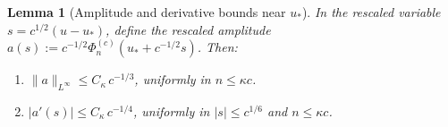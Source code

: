 \documentclass[12pt,a4paper]{amsart}
\newtheorem{lemma}[theorem]{Lemma}
\theoremstyle{definition}
\theoremstyle{remark}
\newcommand{\ustar}{u_*}
\begin{document}
\begin{lemma}[Amplitude and derivative bounds near $\ustar$]
\label{lem:amp-near}
In the rescaled variable $s = c^{1/2}(u - \ustar)$,
define the rescaled amplitude
$a(s) := c^{-1/2}\Phi_n^{(c)}(\ustar + c^{-1/2}s)$.
Then:
\begin{enumerate}[\rm(i)]
  \item $\|a\|_{L^\infty} \le C_\kappa\,c^{-1/3}$,
        uniformly in $n \le \kappa c$.
  \item $|a'(s)| \le C_\kappa\,c^{-1/4}$,
        uniformly in $|s| \le c^{1/6}$ and $n \le \kappa c$.
\end{enumerate}
\end{lemma}
\end{document}
